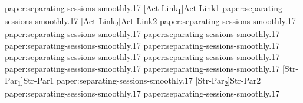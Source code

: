 %
{paper:separating-sessions-smoothly.17}
[Act-Link\textsubscript{1}]{Act-Link1}%
{paper:separating-sessions-smoothly.17}
[Act-Link\textsubscript{2}]{Act-Link2}%
{paper:separating-sessions-smoothly.17}
%
{paper:separating-sessions-smoothly.17}
%
{paper:separating-sessions-smoothly.17}
%
{paper:separating-sessions-smoothly.17}
%
{paper:separating-sessions-smoothly.17}
%
{paper:separating-sessions-smoothly.17}
%
{paper:separating-sessions-smoothly.17}
%
{paper:separating-sessions-smoothly.17}
%
{paper:separating-sessions-smoothly.17}
[Str-Par\textsubscript{1}]{Str-Par1}%
{paper:separating-sessions-smoothly.17}
[Str-Par\textsubscript{2}]{Str-Par2}%
{paper:separating-sessions-smoothly.17}
%
{paper:separating-sessions-smoothly.17}


\newcommand{\paperIItmcolor}[1]{\ensuremath{{\color[HTML]{a40038}#1}}}
\newcommand{\paperIItycolor}[1]{\ensuremath{{\color[HTML]{00007a}#1}}}
\newcommand{\paperIIprcolor}[1]{\ensuremath{{\color[HTML]{009180}#1}}}
\def\paperIItmcolorname{\paperIItmcolor{\text{red}}}%
\def\paperIItycolorname{\paperIItycolor{\text{blue}}}%
\def\paperIIprcolorname{\paperIIprcolor{\text{green}}}%

\newcommand{\paperIIItmcolor}[1]{\ensuremath{{\color[HTML]{a40038}#1}}}
\newcommand{\paperIIItycolor}[1]{\ensuremath{{\color[HTML]{00007a}#1}}}
\newcommand{\paperIIIprcolor}[1]{\ensuremath{{\color[HTML]{009180}#1}}}
\def\paperIIItmcolorname{\paperIIItmcolor{\text{red}}}%
\def\paperIIItycolorname{\paperIIItycolor{\text{blue}}}%
\def\paperIIIprcolorname{\paperIIIprcolor{\text{green}}}%

